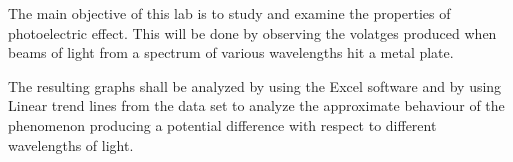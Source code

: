 {The main objective of this lab is to study and examine the properties of photoelectric effect. This will be done by observing the volatges produced when beams of light from a spectrum of various wavelengths hit a metal plate.}

{The resulting graphs shall be analyzed by using the Excel software and by using Linear trend lines from the data set to analyze the approximate behaviour of the phenomenon producing a potential difference with respect to different wavelengths of light.}

{}

